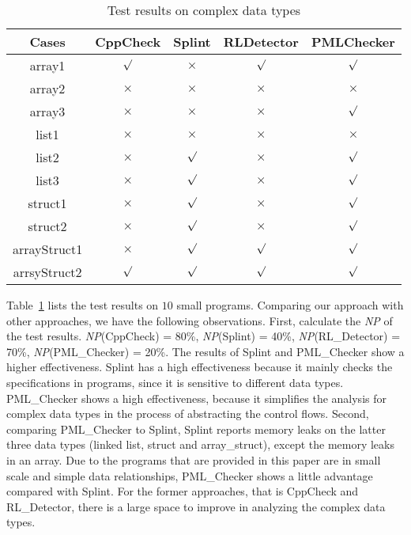 \begin{table}[!h]
\center
\caption{Test results on complex data types}\label{tab:8}
\begin{tabular}{|c|c|c|c|c|}
\hline
\textbf{Cases}  & \textbf{CppCheck} & \textbf{Splint} & \textbf{RLDetector} & \textbf{PMLChecker}\\
\hline
array1	 &	$\surd$ & $\times$ & $\surd$ & $\surd$\\
\hline
array2  & $\times$ & $\times$ & $\times$ & $\times$ \\
\hline
array3	 & $\times$ &	$\times$ & $\times$ & $\surd$\\
\hline
list1 	& $\times$ &$\times$ & $\times$ & $\times$\\
\hline
list2	 & $\times$ & $\surd$ & $\times$ & $\surd$\\
\hline
list3	 &	$\times$	& $\surd$ & $\times$ & $\surd$\\
\hline
struct1	 & $\times$ & $\surd$ & $\times$ & $\surd$\\
\hline
struct2	 & $\times$ & $\surd$ & $\times$ & $\surd$\\
\hline
arrayStruct1	 & $\times$ & $\surd$ & $\surd$ & $\surd$\\
\hline
arrsyStruct2  & $\surd$ & $\surd$ & $\surd$& $\surd$\\
\hline
\end{tabular}
\end{table}


Table~\ref{tab:8} lists the test results on $10$ small programs. Comparing our approach with other approaches, we have the following observations.
First, calculate the \textit{NP} of the test results. \textit{NP}(CppCheck) = 80\%, \textit{NP}(Splint) = 40\%, \textit{NP}(RL\_Detector) = 70\%, \textit{NP}(PML\_Checker) = 20\%. The results of Splint and PML\_Checker show a higher effectiveness. Splint has a high effectiveness because it mainly checks the specifications in programs, since it is sensitive to different data types. PML\_Checker shows a high effectiveness, because it simplifies the analysis for complex data types in the process of abstracting the control flows.
Second, comparing PML\_Checker to Splint, Splint reports memory leaks on the latter three data types (linked list, struct and array\_struct), except the memory leaks in an array. Due to the programs that are provided in this paper are in small scale and simple data relationships, PML\_Checker shows a little advantage compared with Splint. For the former approaches, that is CppCheck and RL\_Detector, there is a large space to improve in analyzing the complex data types.


